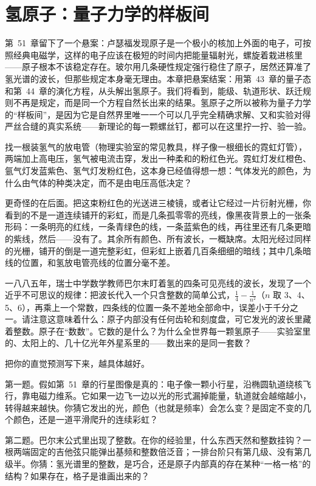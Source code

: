 \chapter{氢原子：量子力学的样板间}

第~51~章留下了一个悬案：卢瑟福发现原子是一个极小的核加上外面的电子，可按照经典电磁学，这样的电子应该在极短的时间内把能量辐射光，螺旋着栽进核里——原子根本不该稳定存在。玻尔用几条硬性规定强行稳住了原子，居然还算准了氢光谱的波长，但那些规定本身毫无理由。本章把悬案结案：用第~43~章的量子态和第~44~章的演化方程，从头解出氢原子。我们将看到，能级、轨道形状、跃迁规则不再是规定，而是同一个方程自然长出来的结果。氢原子之所以被称为量子力学的“样板间”，是因为它是自然界里唯一一个可以几乎完全精确求解、又和实验对得严丝合缝的真实系统——新理论的每一颗螺丝钉，都可以在这里拧一拧、验一验。


找一根装氢气的放电管（物理实验室的常见教具，样子像一根细长的霓虹灯管），两端加上高电压，氢气被电流击穿，发出一种柔和的粉红色光。霓虹灯发红橙色、氩气灯发蓝紫色、氢气灯发粉红色，这本身已经值得想一想：气体发光的颜色，为什么由气体的种类决定，而不是由电压高低决定？

更奇怪的在后面。把这束粉红色的光送进三棱镜，或者让它经过一片衍射光栅，你看到的不是一道连续铺开的彩虹，而是几条孤零零的亮线，像黑夜背景上的一张条形码：一条明亮的红线，一条青绿色的线，一条蓝紫色的线，再往里还有几条更暗的紫线，然后——没有了。其余所有颜色、所有波长，一概缺席。太阳光经过同样的光栅，铺开的倒是一道完整彩虹，但彩虹上嵌着几百条细细的暗线；其中几条暗线的位置，和氢放电管亮线的位置分毫不差。

一八八五年，瑞士中学数学教师巴尔末盯着氢的四条可见亮线的波长，发现了一个近乎不可思议的规律：把波长代入一个只含整数的简单公式，\(\frac{1}{4}-\frac{1}{n^2}\)（\(n\) 取 3、4、5、6），再乘上一个常数，四条线的位置一条不差地全部命中，误差小于千分之一。请注意这意味着什么：原子内部没有任何齿轮和刻度盘，可它发光的波长里藏着整数。原子在“数数”。它数的是什么？为什么全世界每一颗氢原子——实验室里的、太阳上的、几十亿光年外星系里的——数出来的是同一套数？


把你的直觉预测写下来，越具体越好。

第一题。假如第~51~章的行星图像是真的：电子像一颗小行星，沿椭圆轨道绕核飞行，靠电磁力维系。它如果一边飞一边以光的形式漏掉能量，轨道就会越缩越小，转得越来越快。你猜它发出的光，颜色（也就是频率）会怎么变？是固定不变的几个颜色，还是一道平滑爬升的连续彩虹？

第二题。巴尔末公式里出现了整数。在你的经验里，什么东西天然和整数挂钩？一根两端固定的吉他弦只能弹出基频和整数倍泛音；一排台阶只有第几级、没有第几级半。你猜：氢光谱里的整数，是巧合，还是原子内部真的存在某种“一格一格”的结构？如果存在，格子是谁画出来的？

